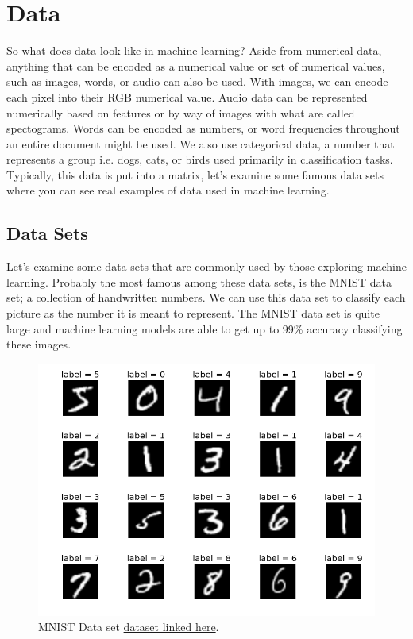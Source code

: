 \documentclass{article}
\begin{document}
\newpage
\section{Data}
So what does data look like in machine learning? Aside from numerical data, anything that can be encoded as a numerical value or set of numerical values, such as images, words, or audio can also be used. With images, we can encode each pixel into their RGB numerical value. Audio data can be represented numerically based on features or by way of images with what are called spectograms. Words can be encoded as numbers, or word frequencies throughout an entire document might be used. We also use categorical data, a number that represents a group i.e. dogs, cats, or birds used primarily in classification tasks. Typically, this data is put into a matrix, let's examine some famous data sets where you can see real examples of data used in machine learning.

\subsection{Data Sets}
Let's examine some data sets that are commonly used by those exploring machine learning. Probably the most famous among these data sets, is the MNIST data set; a collection of handwritten numbers. We can use this data set to classify each picture as the number it is meant to represent. The MNIST data set is quite large and machine learning models are able to get up to 99\% accuracy classifying these images.

\begin{figure}[H]
    \centering
    \includegraphics[width=4.5in]{mnist.png}
    \caption{MNIST Data set \href{http://yann.lecun.com/exdb/mnist/}{dataset linked here}.}
    \label{fig:mnist}
\end{figure}
\end{document}
